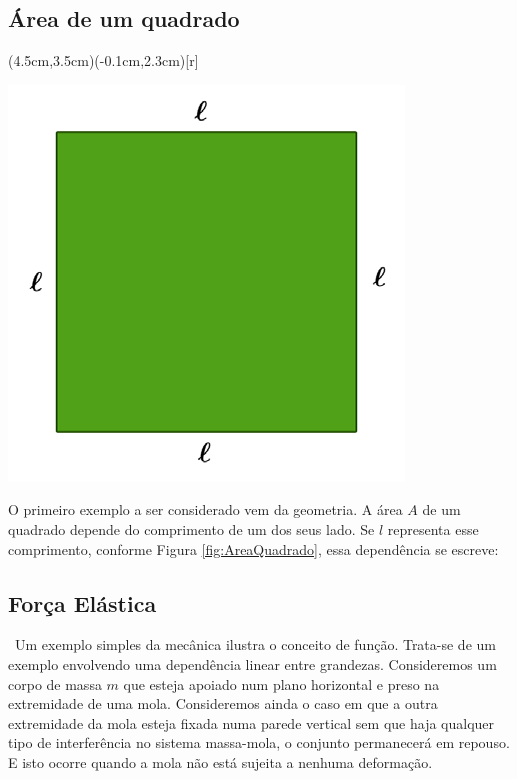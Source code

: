 \documentclass[../main.tex]{subfiles}
\begin{document}
\subsection{Área de um quadrado}
\pichskip{0.1cm}%
\parpic(4.5cm,3.5cm)(-0.1cm,2.3cm)[r]{%
\begin{minipage}{0.25\textwidth}
\includegraphics[scale=0.45]{fig_func/quadrado}
\vspace{-0.9cm}
%
\label{fig:AreaQuadrado}
\end{minipage}
}
\noindent O primeiro exemplo a ser considerado vem da geometria. A área $A$ de um quadrado depende do comprimento de um dos seus lado. Se $l$ representa esse comprimento, conforme Figura \ref{fig:AreaQuadrado}, essa dependência se escreve:
\vspace{1cm}
\subsection{Força Elástica}
%
\noindent\ Um exemplo simples da mecânica ilustra o conceito de função. Trata-se de um exemplo envolvendo uma dependência linear entre grandezas. Consideremos um corpo de massa $m$ que esteja apoiado num plano horizontal e preso na extremidade de uma mola. Consideremos ainda o caso em que a outra extremidade da mola esteja fixada numa parede vertical sem que haja qualquer tipo de interferência no sistema massa-mola, o conjunto permanecerá em repouso. E isto ocorre quando a mola não está sujeita  a nenhuma deformação.
\end{document}

